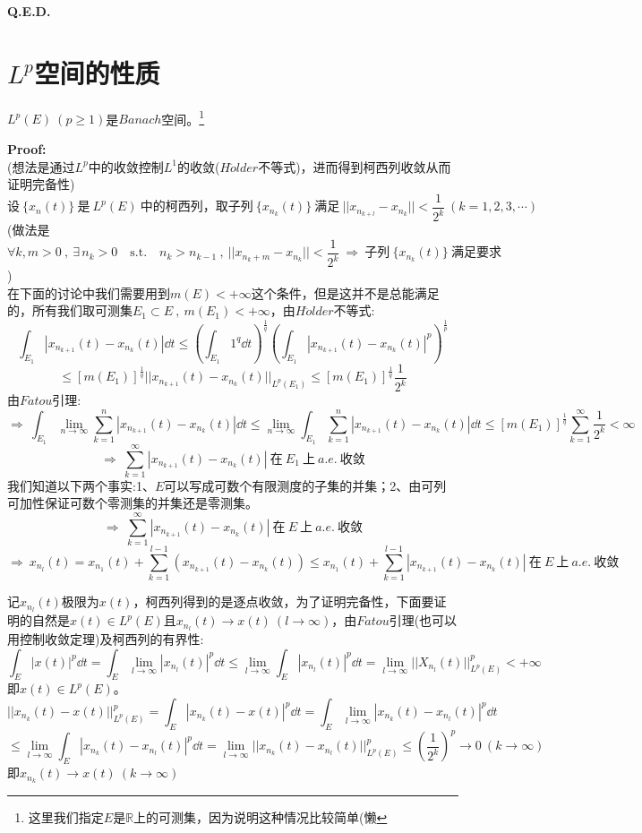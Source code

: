 \textbf{Q.E.D.}

\section{$L^p$空间的性质}
\begin{theorem}
    $L^p(E) \ (p \geq 1)$是$Banach$空间。\footnote{这里我们指定$E$是$\mathbb{R}$上的可测集，因为说明这种情况比较简单(懒}
\end{theorem}
\textbf{Proof:} \\
(想法是通过$L^p$中的收敛控制$L^1$的收敛($H\ddot{o}lder$不等式)，进而得到柯西列收敛从而证明完备性)
\[\text{设} \ \{x_n(t)\} \ \text{是} \ L^p(E) \ \text{中的柯西列，取子列} \ \{x_{n_k}(t)\} \ \text{满足} \ ||x_{n_{k+l}}-x_{n_k}||<\frac{1}{2^k} \ (k=1,2,3,\cdots)\]
(做法是
\[\forall k,m>0 \ , \ \exists \, n_k>0 \quad \text{s.t.} \quad n_{k}>n_{k-1} \ , \ ||x_{n_k+m}-x_{n_k}||<\frac{1}{2^k} \ \Rightarrow \ \text{子列} \ \{x_{n_k}(t)\} \ \text{满足要求}\]
)\\
在下面的讨论中我们需要用到$m(E)<+\infty$这个条件，但是这并不是总能满足的，所有我们取可测集$E_1 \subset E \ , \ m(E_1)<+\infty$，由$H\ddot{o}lder$不等式:
\[\int_{E_1}|x_{n_{k+1}}(t)-x_{n_k}(t)|\dd t \leq \left(\int_{E_1}1^q\dd t\right)^{\frac{1}{q}}\left(\int_{E_1}|x_{n_{k+1}}(t)-x_{n_k}(t)|^p\right)^{\frac{1}{p}}\]
\[\leq \left[m(E_1)\right]^{\frac{1}{q}}||x_{n_{k+1}}(t)-x_{n_k}(t)||_{L^p(E_1)} \leq \left[m(E_1)\right]^{\frac{1}{q}}\frac{1}{2^k}\]
由$Fatou$引理:
\[\Rightarrow \ \int_{E_1} \lim_{n \to \infty}\sum_{k=1}^n|x_{n_{k+1}}(t)-x_{n_k}(t)|\dd t \leq \lim_{n \to \infty} \int_{E_1} \sum_{k=1}^n|x_{n_{k+1}}(t)-x_{n_k}(t)|\dd t \leq \left[m(E_1)\right]^{\frac{1}{q}}\sum_{k=1}^{\infty}\frac{1}{2^k}<\infty\]
\[\Rightarrow \ \sum_{k=1}^{\infty}|x_{n_{k+1}}(t)-x_{n_k}(t)| \ \text{在} \ E_1 \ \text{上} \ a.e. \ \text{收敛}\]
我们知道以下两个事实:1、$E$可以写成可数个有限测度的子集的并集；2、由可列可加性保证可数个零测集的并集还是零测集。
\[\Rightarrow \ \sum_{k=1}^{\infty}|x_{n_{k+1}}(t)-x_{n_k}(t)| \ \text{在} \ E \ \text{上} \ a.e. \ \text{收敛}\]
\[\Rightarrow \ x_{n_l}(t)=x_{n_1}(t)+\sum_{k=1}^{l-1}\left(x_{n_{k+1}}(t)-x_{n_k}(t)\right) \leq x_{n_1}(t)+\sum_{k=1}^{l-1}|x_{n_{k+1}}(t)-x_{n_k}(t)| \ \text{在} \ E \ \text{上} \ a.e. \ \text{收敛}\]

记$x_{n_l}(t)$极限为$x(t)$，柯西列得到的是逐点收敛，为了证明完备性，下面要证明的自然是$x(t) \in L^p(E)$且$x_{n_l}(t) \to x(t) \ (l \to \infty)$，由$Fatou$引理(也可以用控制收敛定理)及柯西列的有界性:
\[\int_E|x(t)|^p\dd t=\int_E\lim_{l \to \infty}|x_{n_l}(t)|^p\dd t \leq \lim_{l \to \infty}\int_E|x_{n_l}(t)|^p\dd t=\lim_{l \to \infty}||X_{n_l}(t)||^p_{L^p(E)}<+\infty\]
即$x(t) \in L^p(E)$。
\[||x_{n_k}(t)-x(t)||^p_{L^p(E)}=\int_E|x_{n_k}(t)-x(t)|^p\dd t=\int_E\lim_{l \to \infty}|x_{n_k}(t)-x_{n_l}(t)|^p\dd t\]
\[\leq \lim_{l \to \infty}\int_E|x_{n_k}(t)-x_{n_l}(t)|^p\dd t=\lim_{l \to \infty}||x_{n_k}(t)-x_{n_l}(t)||^p_{L^p(E)} \leq \left(\frac{1}{2^k}\right)^p \to 0 \ (k \to \infty)\]
即$x_{n_k}(t) \to x(t) \ (k \to \infty)$

